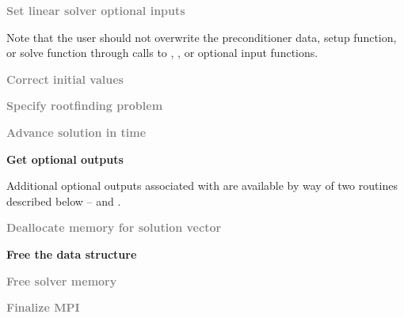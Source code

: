 {\begin{Steps}
\item
  \textcolor{gray}{\bf Set linear solver optional inputs}

  Note that the user should not overwrite the preconditioner data, setup function, 
  or solve function through calls to {\idaspgmr}, {\idaspbcg}, or {\idasptfqmr}
  optional input functions.

\item
  \textcolor{gray}{\bf Correct initial values}

\item
  \textcolor{gray}{\bf Specify rootfinding problem}

\item
  \textcolor{gray}{\bf Advance solution in time}

\item
  {\bf Get optional outputs}

  Additional optional outputs associated with {\idabbdpre} are available by 
  way of two routines described below --
   and .

\item
  \textcolor{gray}{\bf Deallocate memory for solution vector}

\item \label{i:bbdpre_free}
  {\bf Free the {\idabbdpre} data structure}


\item
  \textcolor{gray}{\bf Free solver memory}
  
\item 
  \textcolor{gray}{\bf Finalize MPI}


\end{Steps}}
